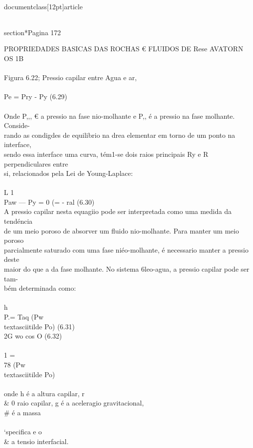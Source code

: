 \\documentclass[12pt]{article}
\begin{document}
\\section*{Pagina 172}

PROPRIEDADES BASICAS DAS ROCHAS € FLUIDOS DE Rese AVATORN\\
OS 1B\\
\\
Figura 6.22; Pressio capilar entre Agua e ar,\\
\\
Pe = Pry - Py (6.29)\\
\\
Onde P,,, € a pressio na fase nio-molhante e P,, é a pressio na fase molhante. Conside-\\
rando as condigdes de equilibrio na drea elementar em torno de um ponto na interface,\\
sendo essa interface uma curva, tém1-se dois raios principais Ry e R perpendiculares entre\\
si, relacionados pela Lei de Young-Laplace:\\
\\
L 1\\
Paw — Py = 0 (= - ral (6.30)\\
A pressio capilar nesta equagiio pode ser interpretada como uma medida da tendéncia\\
de um meio poroso de absorver um fluido nio-molhante. Para manter um meio poroso\\
parcialmente saturado com uma fase niéo-molhante, é necessario manter a pressio deste\\
maior do que a da fase molhante. No sistema 6leo-agua, a pressio capilar pode ser tam-\\
bém determinada como:\\
\\
h\\
P.= Taq (Pw \\textasciitilde{} Po) (6.31)\\
2G wo cos O (6.32)\\
\\
1 =\\
78 (Pw \\textasciitilde{} Po)\\
\\
onde h é a altura capilar, r \\& 0 raio capilar, g é a aceleragio gravitacional, \\# é a massa\\
\\
‘specifica e o \\& a tensio interfacial.\\
\end{document}
